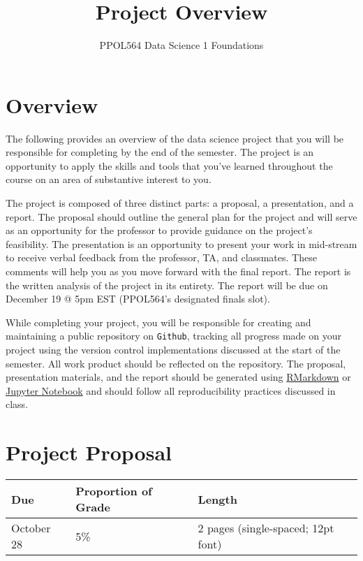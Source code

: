 \documentclass[
  12pt,
]{article}
\title{\textbf{Project Overview}}
\author{\Large PPOL564 \textbar{} Data Science 1 \textbar{} Foundations}
\date{}
\begin{document}
\maketitle

{
\setcounter{tocdepth}{3}
\tableofcontents
}
\hypertarget{overview}{%
\section{Overview}\label{overview}}

The following provides an overview of the data science project that you
will be responsible for completing by the end of the semester. The
project is an opportunity to apply the skills and tools that you've
learned throughout the course on an area of substantive interest to you.

The project is composed of three distinct parts: a proposal, a
presentation, and a report. The proposal should outline the general plan
for the project and will serve as an opportunity for the professor to
provide guidance on the project's feasibility. The presentation is an
opportunity to present your work in mid-stream to receive verbal
feedback from the professor, TA, and classmates. These comments will
help you as you move forward with the final report. The report is the
written analysis of the project in its entirety. The report will be due
on December 19 @ 5pm EST (PPOL564's designated finals slot).

While completing your project, you will be responsible for creating and
maintaining a public repository on \texttt{Github}, tracking all
progress made on your project using the version control implementations
discussed at the start of the semester. All work product should be
reflected on the repository. The proposal, presentation materials, and
the report should be generated using
\href{https://rmarkdown.rstudio.com/authoring_quick_tour.html}{RMarkdown}
or \href{https://jupyter.org/}{Jupyter Notebook} and should follow all
reproducibility practices discussed in class.

\hypertarget{project-proposal}{%
\section{Project Proposal}\label{project-proposal}}

\begin{longtable}[]{@{}lll@{}}
\toprule
\textbf{Due} & \textbf{Proportion of Grade} &
\textbf{Length}\tabularnewline
\midrule
\endhead
October 28 & 5\% & 2 pages (single-spaced; 12pt font)\tabularnewline
\bottomrule
\end{longtable}
\end{document}
